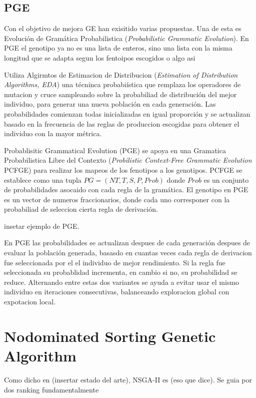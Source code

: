 \subsection{PGE}
Con el objetivo de mejora GE han exisitido varias propuestas. Una de esta es Evoluci\'on de Gram\'atica Probabilistica (\textit{Probabilistic Grammatic Evolution}). En PGE el genotipo ya no es una lista de enteros, sino una lista con la misma longitud que se adapta segun los fentoipos escogidos o algo asi

Utiliza Algirmtos de Estimacion de Distribucion (\textit{Estimation of Distribution Algorithms, EDA}) una t\'ecninca probabi\'istica que remplaza los operadores de mutacion y cruce sampleando sobre la probabiliad de distribuci\'on del mejor individuo, para generar una nueva poblaci\'on en cada generaci\'on. Las probabilidades comienzan todas inicializadas en igual proporci\'on  y se actualizan basado en la frecuencia de las reglas de produccion escogidas para obtener el individuo con la mayor m\'etrica.

Probablisitic Grammatical Evolution (PGE)  se apoya en una Gramatica Probabilistica Libre del Contexto (\textit{Probilistic Context-Free Grammatic Evolution} PCFGE) para realizar los mapeos de los fenotipos a los genotipos. PCFGE se establece como una tupla $PG = (NT, T, S, P, Prob)$ donde $Prob$  es un conjunto de probabilidades asocaido con cada regla de la gram\'atica. El genotipo en PGE es un vector de numeros fraccionarios, donde cada uno corresponer con la probabiliad de seleccion cierta regla de derivaci\'on.

insetar ejemplo de PGE.

En PGE las probabilidades se actualizan despues de cada generaci\'on  despues de evaluar la poblaci\'on generada, basasdo en cuantas veces cada regla de derivacion fue seleccionada por el el individuo de mejor rendimiento. Si la regla fue seleccionada su probablidad incrementa, en cambio si no, su probabilidad se reduce. Alternando entre estas dos variantes se ayuda a evitar usar el mismo individuo en iteraciones consecutivas, balanceando exploracion global con expotacion local.

\section{Nodominated Sorting Genetic Algorithm}

Como dicho en (insertar estado del arte), NSGA-II es (eso que dice). Se guia por dos ranking fundamentalmente

